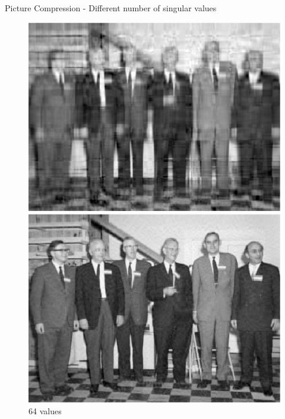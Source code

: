 \documentclass[10pt,a4paper]{beamer}
\begin{document}
\begin{frame}{Picture Compression - Different number of singular values}
	\begin{figure}
		\begin{minipage}{0.24\linewidth}
			\includegraphics[width=1\linewidth]{SVD/SVD.Tronquee.16.eps}
				\caption{16 values}
		\end{minipage}
		\begin{minipage}{0.24\linewidth}
			\includegraphics[width=1\linewidth]{SVD/SVD.Tronquee.64.eps}
				\caption{64 values}
		\end{minipage}
		\begin{minipage}{0.24\linewidth}

\end{minipage}
\end{figure}
\end{frame}
\end{document}
